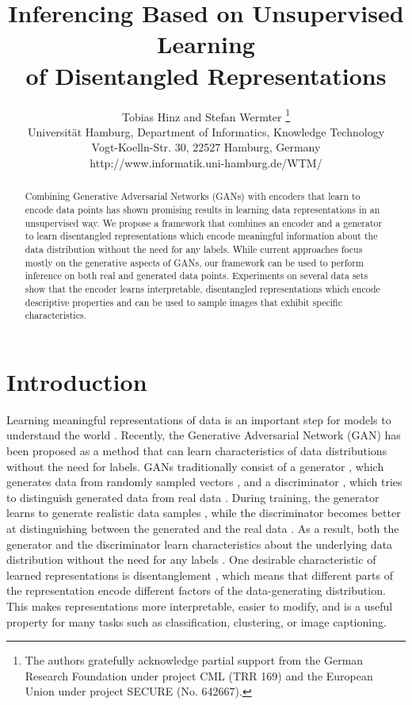 \documentclass{esannV2}
\begin{document}
\title{Inferencing Based on Unsupervised Learning\\of Disentangled Representations}

\author{Tobias Hinz and Stefan Wermter
\thanks{The authors gratefully acknowledge partial support from the German Research Foundation under project CML (TRR 169) and the European Union under project SECURE (No. 642667).}
\vspace{.3cm}\\
Universit\"at Hamburg, Department of Informatics, Knowledge Technology \\
Vogt-Koelln-Str. 30, 22527 Hamburg, Germany \\
http://www.informatik.uni-hamburg.de/WTM/
}


\maketitle

\begin{abstract}
Combining Generative Adversarial Networks (GANs) with encoders that learn to encode data points has shown promising results in learning data representations in an unsupervised way. We propose a framework that combines an encoder and a generator to learn disentangled representations which encode meaningful information about the data distribution without the need for any labels. While current approaches focus mostly on the generative aspects of GANs, our framework can be used to perform inference on both real and generated data points. Experiments on several data sets show that the encoder learns interpretable, disentangled representations which encode descriptive properties and can be used to sample images that exhibit specific characteristics.
\end{abstract}

\section{Introduction}
Learning meaningful representations of data is an important step for models to understand the world \cite{Bengio2013}. Recently, the Generative Adversarial Network (GAN) \cite{Goodfellow2014} has been proposed as a method that can learn characteristics of data distributions without the need for labels. GANs traditionally consist of a generator , which generates data from randomly sampled vectors , and a discriminator , which tries to distinguish generated data from real data . During training, the generator learns to generate realistic data samples , while the discriminator becomes better at distinguishing between the generated and the real data . As a result, both the generator and the discriminator learn characteristics about the underlying data distribution without the need for any labels \cite{Radford2015}.
One desirable characteristic of learned representations is disentanglement \cite{Bengio2013}, which means that different parts of the representation encode different factors of the data-generating distribution. This makes representations more interpretable, easier to modify, and is a useful property for many tasks such as classification, clustering, or image captioning.
\end{document}
